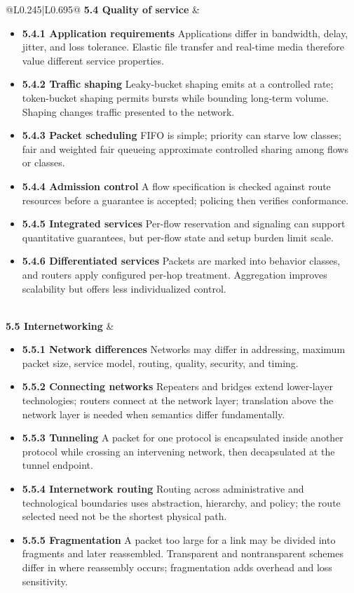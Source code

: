 \documentclass[10pt,letterpaper]{article}
\begin{document}
\begin{longtable}{@{}L{0.245\textwidth}|L{0.695\textwidth}@{}}
\textbf{5.4 Quality of service} & \begin{minipage}[t]{\linewidth}\raggedright \begin{itemize}\item \textbf{5.4.1 Application requirements} Applications differ in bandwidth, delay, jitter, and loss tolerance. Elastic file transfer and real-time media therefore value different service properties.\item \textbf{5.4.2 Traffic shaping} Leaky-bucket shaping emits at a controlled rate; token-bucket shaping permits bursts while bounding long-term volume. Shaping changes traffic presented to the network.\item \textbf{5.4.3 Packet scheduling} FIFO is simple; priority can starve low classes; fair and weighted fair queueing approximate controlled sharing among flows or classes.\item \textbf{5.4.4 Admission control} A flow specification is checked against route resources before a guarantee is accepted; policing then verifies conformance.\item \textbf{5.4.5 Integrated services} Per-flow reservation and signaling can support quantitative guarantees, but per-flow state and setup burden limit scale.\item \textbf{5.4.6 Differentiated services} Packets are marked into behavior classes, and routers apply configured per-hop treatment. Aggregation improves scalability but offers less individualized control.\end{itemize}\end{minipage} \\ \hline
{}\textbf{5.5 Internetworking} & \begin{minipage}[t]{\linewidth}\raggedright \begin{itemize}\item \textbf{5.5.1 Network differences} Networks may differ in addressing, maximum packet size, service model, routing, quality, security, and timing.\item \textbf{5.5.2 Connecting networks} Repeaters and bridges extend lower-layer technologies; routers connect at the network layer; translation above the network layer is needed when semantics differ fundamentally.\item \textbf{5.5.3 Tunneling} A packet for one protocol is encapsulated inside another protocol while crossing an intervening network, then decapsulated at the tunnel endpoint.\item \textbf{5.5.4 Internetwork routing} Routing across administrative and technological boundaries uses abstraction, hierarchy, and policy; the route selected need not be the shortest physical path.\item \textbf{5.5.5 Fragmentation} A packet too large for a link may be divided into fragments and later reassembled. Transparent and nontransparent schemes differ in where reassembly occurs; fragmentation adds overhead and loss sensitivity.\end{itemize}\end{minipage} \\ \hline

\end{longtable}
\end{document}
